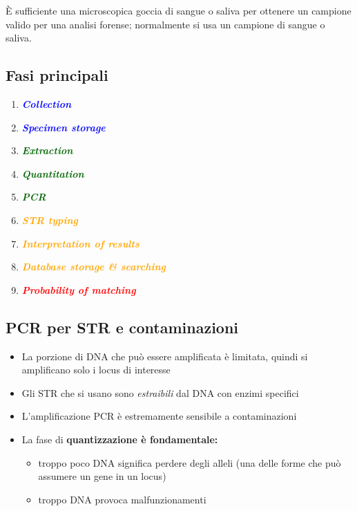 \documentclass{report}
\begin{document}
\noindent È sufficiente una microscopica goccia di sangue o saliva per ottenere un campione 
valido per una analisi forense; normalmente si usa un campione di sangue o saliva.

\subsection{Fasi principali}
\begin{enumerate}
    \item \textcolor{blue}{\textbf{\textit{Collection}}}
    \item \textcolor{blue}{\textbf{\textit{Specimen storage}}}
    \item \textcolor{darkgreen}{\textbf{\textit{Extraction}}}
    \item \textcolor{darkgreen}{\textbf{\textit{Quantitation}}}
    \item \textcolor{darkgreen}{\textbf{\textit{PCR}}}
    \item \textcolor{orange}{\textbf{\textit{STR typing}}}
    \item \textcolor{orange}{\textbf{\textit{Interpretation of results}}}
    \item \textcolor{orange}{\textbf{\textit{Database storage \& searching}}}
    \item \textcolor{red}{\textbf{\textit{Probability of matching}}}
\end{enumerate}

\subsection{PCR per STR e contaminazioni}
\begin{itemize}
    \item La porzione di DNA che può essere amplificata è limitata, quindi si amplificano 
    solo i locus di interesse
    \item Gli STR che si usano sono \textit{estraibili} dal DNA con enzimi specifici
    \item L'amplificazione PCR è estremamente sensibile a contaminazioni
    \item La fase di \textbf{quantizzazione è fondamentale:}
    \begin{itemize}
        \item troppo poco DNA significa perdere degli alleli (una delle forme che può assumere un gene in un locus)
        \item troppo DNA provoca malfunzionamenti
    \end{itemize}
\end{itemize}
\end{document}
